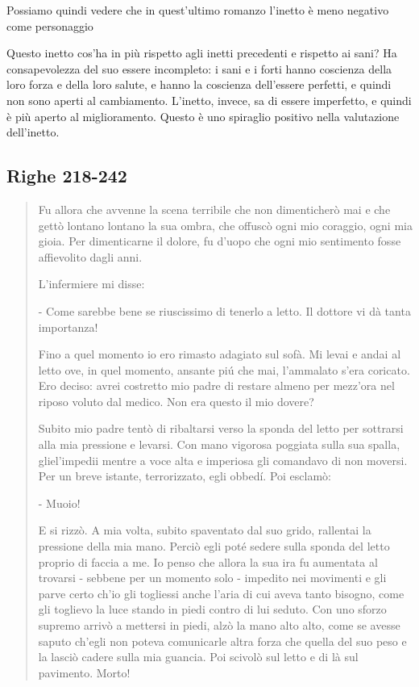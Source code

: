 \documentclass[a4paper, twoside, titlepage]{book}
\begin{document}
Possiamo quindi vedere che in quest'ultimo romanzo l'inetto è meno negativo come personaggio

Questo inetto cos'ha in più rispetto agli inetti precedenti e rispetto ai sani? Ha consapevolezza del suo essere incompleto: i sani e i forti hanno coscienza della loro forza e della loro salute, e hanno la coscienza dell'essere perfetti, e quindi non sono aperti al cambiamento.
L'inetto, invece, sa di essere imperfetto, e quindi è più aperto al miglioramento. Questo è uno spiraglio positivo nella valutazione dell'inetto.

\subsection*{Righe 218-242}

\begin{quotation}
Fu allora che avvenne la scena terribile che non dimenticherò mai e che gettò lontano lontano la sua ombra, che offuscò ogni mio coraggio, ogni mia gioia. Per dimenticarne il dolore, fu d’uopo che ogni mio sentimento fosse affievolito dagli anni.

L’infermiere mi disse:

- Come sarebbe bene se riuscissimo di tenerlo a letto. Il dottore vi dà tanta importanza!

Fino a quel momento io ero rimasto adagiato sul sofà. Mi levai e andai al letto ove, in quel momento, ansante piú che mai, l’ammalato s’era coricato. Ero deciso: avrei costretto mio padre di restare almeno per mezz’ora nel riposo voluto dal medico. Non era questo il mio dovere?

Subito mio padre tentò di ribaltarsi verso la sponda del letto per sottrarsi alla mia pressione e levarsi. Con mano vigorosa poggiata sulla sua spalla, gliel’impedii mentre a voce alta e imperiosa gli comandavo di non moversi. Per un breve istante, terrorizzato, egli obbedí. Poi esclamò:

- Muoio!

E si rizzò. A mia volta, subito spaventato dal suo grido, rallentai la pressione della mia mano. Perciò egli poté sedere sulla sponda del letto proprio di faccia a me. Io penso che allora la sua ira fu aumentata al trovarsi - sebbene per un momento solo - impedito nei movimenti e gli parve certo ch’io gli togliessi anche l’aria di cui aveva tanto bisogno, come gli toglievo la luce stando in piedi contro di lui seduto. Con uno sforzo supremo arrivò a mettersi in piedi, alzò la mano alto alto, come se avesse saputo ch’egli non poteva comunicarle altra forza che quella del suo peso e la lasciò cadere sulla mia guancia. Poi scivolò sul letto e di là sul pavimento. Morto!


\end{quotation}
\end{document}
